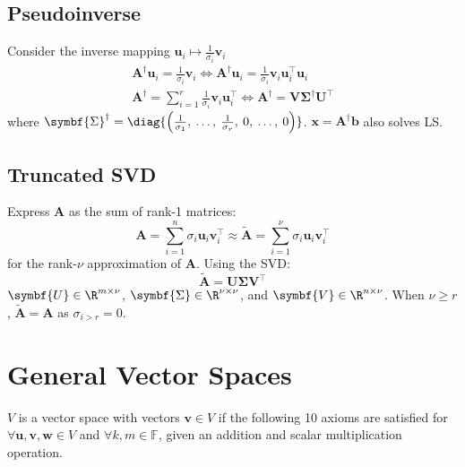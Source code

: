 \documentclass{article}
\begin{document}
\begin{multicols*}{3}
    \subsection{Pseudoinverse}
    Consider the inverse mapping \(\symbf{u}_i \mapsto
    \frac{1}{\sigma_i} \symbf{v}_i\)
    \begin{gather*}
        \symbf{A}^\dagger \symbf{u}_i = \frac{1}{\sigma_i} \symbf{v}_i
        \iff
        \symbf{A}^\dagger \symbf{u}_i = \frac{1}{\sigma_i} \symbf{v}_i \symbf{u}^\top_i \symbf{u}_i \\
        \symbf{A}^\dagger = \sum_{i = 1}^r \frac{1}{\sigma_i} \symbf{v}_i \symbf{u}^\top_i
        \iff
        \symbf{A}^\dagger = \symbf{V} \symbf{\Sigma}^\dagger \symbf{U}^\top
    \end{gather*}
    where \(\symbf{\Sigma}^\dagger = \diag{\left( \frac{1}{\sigma_1},\: \dots,\: \frac{1}{\sigma_r},\: 0,\: \dots,\: 0 \right)}\).
    \(\symbf{x} = \symbf{A}^\dagger \symbf{b}\) also solves LS\@.
    \subsection{Truncated SVD}
    Express \(\symbf{A}\) as the sum of rank-1 matrices:
    \begin{equation*}
        \symbf{A} = \sum_{i = 1}^n \sigma_i \symbf{u}_i \symbf{v}^\top_i \approx \tilde{\symbf{A}} = \sum_{i = 1}^\nu \sigma_i \symbf{u}_i \symbf{v}^\top_i
    \end{equation*}
    for the rank-\(\nu\) approximation of \(\symbf{A}\).
    Using the SVD\@:
    \begin{equation*}
        \tilde{\symbf{A}} = \symbf{U} \symbf{\Sigma} \symbf{V}^\top
    \end{equation*}
    \(\symbf{U} \in \R^{m \times \nu}\), \(\symbf{\Sigma} \in \R^{\nu \times \nu}\), and \(\symbf{V} \in \R^{n \times \nu}\).
    When \(\nu \geq r\), \(\tilde{\symbf{A}} = \symbf{A}\) as
    \(\sigma_{i > r} = 0\).
    \section{General Vector Spaces}
    \(V\) is a vector space with vectors \(\symbf{v} \in V\) if the following 10 axioms are satisfied
    for \(\forall \symbf{u}, \symbf{v}, \symbf{w} \in V\) and \(\forall k, m \in \mathbb{F}\),
    given an addition and scalar multiplication operation.


\end{multicols*}
\end{document}
